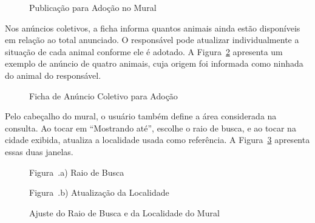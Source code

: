 \begin{figure}[H]
    \centering
    \caption{Publicação para Adoção no Mural}
    \label{fig:tela_adocao}
\end{figure}

Nos anúncios coletivos, a ficha informa quantos animais ainda estão disponíveis em relação ao total anunciado. O responsável pode atualizar individualmente a situação de cada animal conforme ele é adotado. A Figura~\ref{fig:tela_adocao_grupo} apresenta um exemplo de anúncio de quatro animais, cuja origem foi informada como ninhada do animal do responsável.

\begin{figure}[H]
    \centering
    \caption{Ficha de Anúncio Coletivo para Adoção}
    \label{fig:tela_adocao_grupo}
\end{figure}

Pelo cabeçalho do mural, o usuário também define a área considerada na consulta. Ao tocar em ``Mostrando até'', escolhe o raio de busca, e ao tocar na cidade exibida, atualiza a localidade usada como referência. A Figura~\ref{fig:tela_raio_localidade} apresenta essas duas janelas.

\begin{figure}[H]
    \centering
    \caption{Ajuste do Raio de Busca e da Localidade do Mural}
    \label{fig:tela_raio_localidade}
    \vspace{0.15cm}
    \begin{minipage}[t]{0.48\textwidth}
        \centering
        \par\vspace{0.12cm}
        {\small Figura~\thefigure.a) Raio de Busca}
    \end{minipage}
    \hfill
    \begin{minipage}[t]{0.48\textwidth}
        \centering
        \par\vspace{0.12cm}
        {\small Figura~\thefigure.b) Atualização da Localidade}
    \end{minipage}
    \par\vspace{0.12cm}
\end{figure}


